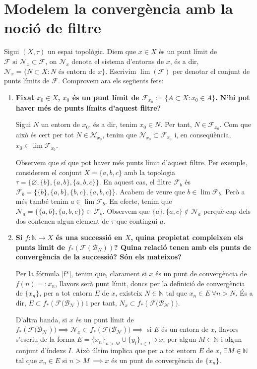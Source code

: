 \documentclass[10pt,a4paper]{article}
\newcommand{\NN}{\ensuremath{\mathbb{N}}}
\begin{document}
\section{Modelem la convergència amb la noció de filtre}
Sigui $(X,\tau)$ un espai topològic. Diem que $x \in X$ és un punt límit de $\mathcal{F} \text{ si } \mathcal{N}_x \subset \mathcal{F}$, on $\mathcal{N}_x$ denota el sistema d'entorns de $x$, és a dir, $\mathcal{N}_x=\{N\subset X:N\text{ és entorn de $x$}\}$. Escrivim $\lim (\mathcal{F})$ per denotar el conjunt de punts límits de $\mathcal{F}$. Comprovem ara els següents fets:
\begin{enumerate}
      \item\label{3.1} \textbf{Fixat $x_0\in X$, $x_0$ és un punt límit de $\mathcal{F}_{x_0}:=\{A\subset X:x_0\in A\}$. N'hi pot haver més de punts límits d'aquest filtre?}

            Sigui $N$ un entorn de $x_0$, és a dir, tenim $x_0\in N$. Per tant, $N\in\mathcal{F}_{x_0}$. Com que això és cert per tot $N\in\mathcal{N}_{x_0}$, tenim que $\mathcal{N}_{x_0}\subset\mathcal{F}_{x_0}$ i, en conseqüència, $x_0\in\lim \mathcal{F}_{x_0}$.

            Observem que sí que pot haver més punts límit d'aquest filtre. Per exemple, considerem el conjunt $X=\{a,b,c\}$ amb la topologia $\tau=\{\varnothing,\{b\},\{a,b\},\{a,b,c\}\}$. En aquest cas, el filtre $\mathcal{F}_b$ és $\mathcal{F}_b=\{\{b\},\{a,b\},\{b,c\},\{a,b,c\}\}$. Acabem de veure que $b\in\lim\mathcal{F}_b$. Però a més també tenim $a\in\lim\mathcal{F}_b$. En efecte, tenim que $\mathcal{N}_a=\{\{a,b\},\{a,b,c\}\}\subset \mathcal{F}_b$. Observem que $\{a\},\{a,c\}\notin \mathcal{N}_a$ perquè cap dels dos contenen algun element de $\tau$ que contingui $a$.
      \item \textbf{Si $f:\NN\rightarrow X$ és una successió en $X$, quina propietat compleixen els punts límit de $f_*(\mathcal{F}(\mathcal{B}_N))$? Quina relació tenen amb els punts de convergència de la successió? Són els mateixos?}

            Per la fórmula \eqref{f*}, tenim que, clarament si $x$ és un punt de convergència de $f(n)=:x_n$, llavors serà punt límit, doncs per la definició de convergència de $\{x_n\}$, per a tot entorn $E$ de $x$, existeix $N \in \mathbb N$ tal que $x_n\in E\ \forall n>N$. És a dir, $E \subset f_*(\mathcal{F(B_N}))$ i per tant, $N_x\subset f_*(\mathcal{F(B_N}))$.

            D'altra banda, si $x$ és un punt límit de $f_*(\mathcal{F(B_N})) \implies \mathcal{N}_x \subset f_*(\mathcal{F(B_N})) \implies$ si $E$ és un entorn de $x$, llavors s'escriu de la forma $E=\{x_n\}_{n>M}\cup \{y_i\}_{i\in I} \ni x$, per algun $M\in \mathbb N$ i algun conjunt d'índexs $I$. Això últim implica que per a tot entorn $E$ de $x$, $\exists M\in \mathbb N$ tal que $x_n \in E$ si $n>M \ \implies x$ és un punt de convergència de $\{x_n\}$.


\end{enumerate}
\end{document}
